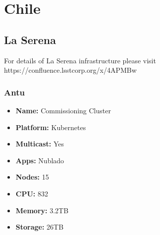 \section{Chile}
\subsection{La Serena}
For details of La Serena infrastructure please visit https://confluence.lsstcorp.org/x/4APMBw

\newpage
\subsubsection{Antu}
\begin{itemize}
  \itemsep0em 
  \item \textbf{Name:}      Commissioning Cluster
  \item \textbf{Platform:}  Kubernetes
  \item \textbf{Multicast:} Yes
  \item \textbf{Apps:}      Nublado
  \item \textbf{Nodes:}     15
  \item \textbf{CPU:}       832
  \item \textbf{Memory:}    3.2TB
  \item \textbf{Storage:}   26TB
\end{itemize}
